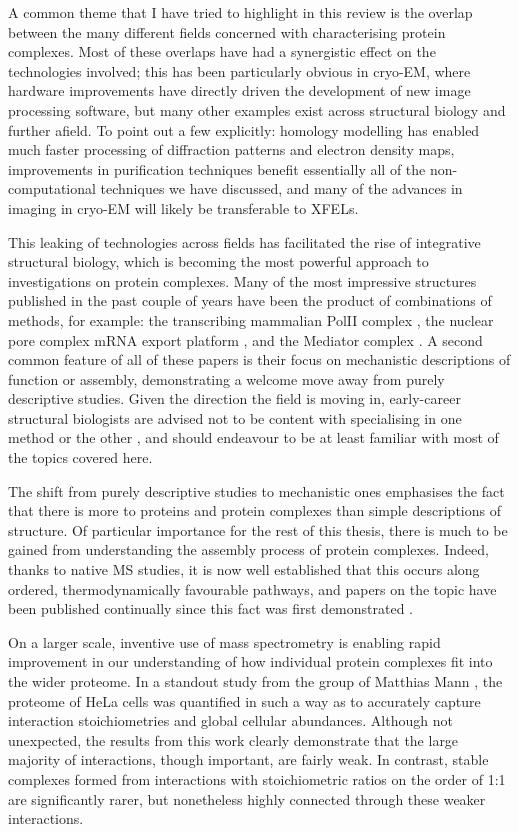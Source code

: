 \documentclass[a4paper,11pt,twoside,openright]{scrbook}
\begin{document}
A common theme that I have tried to highlight in this review is the overlap between the many different fields concerned with characterising protein complexes. Most of these overlaps have had a synergistic effect on the technologies involved; this has been particularly obvious in cryo-EM, where hardware improvements have directly driven the development of new image processing software, but many other examples exist across structural biology and further afield. To point out a few explicitly: homology modelling has enabled much faster processing of diffraction patterns and electron density maps, improvements in purification techniques benefit essentially all of the non-computational techniques we have discussed, and many of the advances in imaging in cryo-EM will likely be transferable to XFELs.

This leaking of technologies across fields has facilitated the rise of integrative structural biology, which is becoming the most powerful approach to investigations on protein complexes. Many of the most impressive structures published in the past couple of years have been the product of combinations of methods, for example: the transcribing mammalian PolII complex \cite{Bernecky2016}, the nuclear pore complex mRNA export platform \cite{Fernandez-Martinez2016}, and the Mediator complex \cite{Tsai2017}. A second common feature of all of these papers is their focus on mechanistic descriptions of function or assembly, demonstrating a welcome move away from purely descriptive studies. Given the direction the field is moving in, early-career structural biologists are advised not to be content with specialising in one method or the other \cite{Shi2014,Cassiday2014}, and should endeavour to be at least familiar with most of the topics covered here.

The shift from purely descriptive studies to mechanistic ones emphasises the fact that there is more to proteins and protein complexes than simple descriptions of structure. Of particular importance for the rest of this thesis, there is much to be gained from understanding the assembly process of protein complexes. Indeed, thanks to native MS studies, it is now well established that this occurs along ordered, thermodynamically favourable pathways, and papers on the topic have been published continually since this fact was first demonstrated \cite{Levy2008,Marsh2013,Appolaire2014,Macek2017,Mallik2017}.

On a larger scale, inventive use of mass spectrometry is enabling rapid improvement in our understanding of how individual protein complexes fit into the wider proteome. In a standout study from the group of Matthias Mann \cite{Hein2015}, the proteome of HeLa cells was quantified in such a way as to accurately capture interaction stoichiometries and global cellular abundances. Although not unexpected, the results from this work clearly demonstrate that the large majority of interactions, though important, are fairly weak. In contrast, stable complexes formed from interactions with stoichiometric ratios on the order of 1:1 are significantly rarer, but nonetheless highly connected through these weaker interactions.
\end{document}

